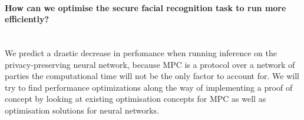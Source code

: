 \paragraph{How can we optimise the secure facial recognition task to run more efficiently?}\mbox{}
\\
We predict a drastic decrease in perfomance when running inference on the privacy-preserving neural network, because MPC is a protocol over a network of parties the computational time will not be the only factor to account for. We will try to find performance optimizations along the way of implementing a proof of concept by looking at existing optimisation concepts for MPC as well as optimisation solutions for neural networks.

